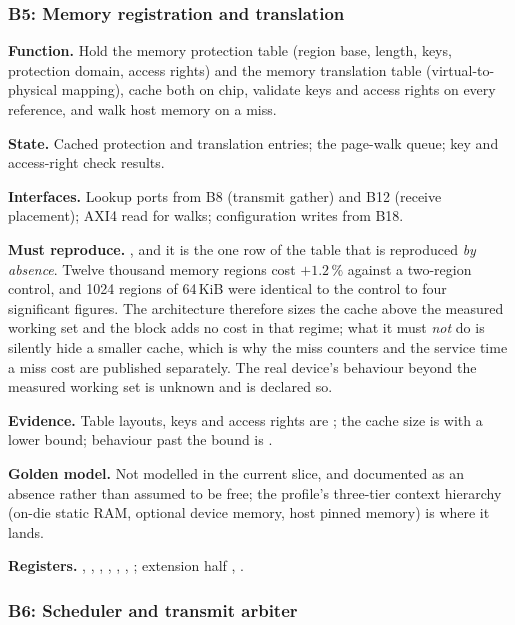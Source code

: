 \subsubsection{B5: Memory registration and translation}

\textbf{Function.} Hold the memory protection table (region base, length, keys,
protection domain, access rights) and the memory translation table
(virtual-to-physical mapping), cache both on chip, validate keys and access
rights on every reference, and walk host memory on a miss.

\textbf{State.} Cached protection and translation entries; the page-walk queue;
key and access-right check results.

\textbf{Interfaces.} Lookup ports from B8 (transmit gather) and B12 (receive
placement); AXI4 read for walks; configuration writes from B18.

\textbf{Must reproduce.} , and it is the one row of the table that is
reproduced \emph{by absence}. Twelve thousand memory regions cost $+1.2\,\%$
against a two-region control, and 1024 regions of 64\,KiB were identical to the
control to four significant figures. The architecture therefore sizes the cache
above the measured working set and the block adds no cost in that regime; what
it must \emph{not} do is silently hide a smaller cache, which is why the miss
counters and the service time a miss cost are published separately. The real
device's behaviour beyond the measured working set is unknown and is declared
so.

\textbf{Evidence.} Table layouts, keys and access rights are \evdoc{}; the
cache size is \evcal{} with a lower bound; behaviour past the bound is
\evdecl{}.

\textbf{Golden model.} Not modelled in the current slice, and documented as an
absence rather than assumed to be free; the profile's three-tier context
hierarchy (on-die static RAM, optional device memory, host pinned memory) is
where it lands.

{\raggedright
\textbf{Registers.} , , ,
, , ,
; extension half ,
.\par}

\subsubsection{B6: Scheduler and transmit arbiter}

